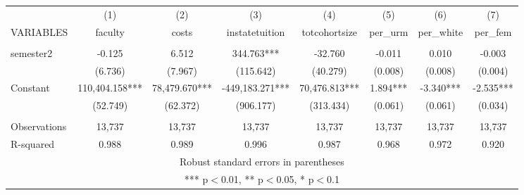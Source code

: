 \documentclass[]{article}
\begin{document}
\begin{tabular}{lccccccc} \hline
 & (1) & (2) & (3) & (4) & (5) & (6) & (7) \\
VARIABLES & faculty & costs & instatetuition & totcohortsize & per\_urm & per\_white & per\_fem \\ \hline
 &  &  &  &  &  &  &  \\
semester2 & -0.125 & 6.512 & 344.763*** & -32.760 & -0.011 & 0.010 & -0.003 \\
 & (6.736) & (7.967) & (115.642) & (40.279) & (0.008) & (0.008) & (0.004) \\
Constant & 110,404.158*** & 78,479.670*** & -449,183.271*** & 70,476.813*** & 1.894*** & -3.340*** & -2.535*** \\
 & (52.749) & (62.372) & (906.177) & (313.434) & (0.061) & (0.061) & (0.034) \\
 &  &  &  &  &  &  &  \\
Observations & 13,737 & 13,737 & 13,737 & 13,737 & 13,737 & 13,737 & 13,737 \\
 R-squared & 0.988 & 0.989 & 0.996 & 0.987 & 0.968 & 0.972 & 0.920 \\ \hline
\multicolumn{8}{c}{ Robust standard errors in parentheses} \\
\multicolumn{8}{c}{ *** p$<$0.01, ** p$<$0.05, * p$<$0.1} \\
\end{tabular}
\end{document}

